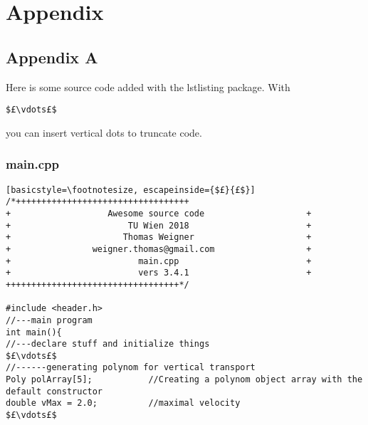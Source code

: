 \chapter{Appendix}\label{chap:appendix}
\section{Appendix A}\label{sec:appendix_a}

Here is some source code added with the lstlisting package. With \begin{verbatim}$£\vdots£$\end{verbatim} you can insert vertical dots to truncate code.
\subsection{main.cpp}\label{sec:main.cpp}
\begin{lstlisting}[basicstyle=\footnotesize, escapeinside={$£}{£$}]
/*++++++++++++++++++++++++++++++++++
+                   Awesome source code                    +
+                       TU Wien 2018                       +
+                      Thomas Weigner                      +
+                weigner.thomas@gmail.com                  +
+                         main.cpp                         +
+                         vers 3.4.1                       +
++++++++++++++++++++++++++++++++++*/

#include <header.h>
//---main program
int main(){
//---declare stuff and initialize things
$£\vdots£$
//------generating polynom for vertical transport
Poly polArray[5];           //Creating a polynom object array with the default constructor
double vMax = 2.0;          //maximal velocity
$£\vdots£$
\end{lstlisting}